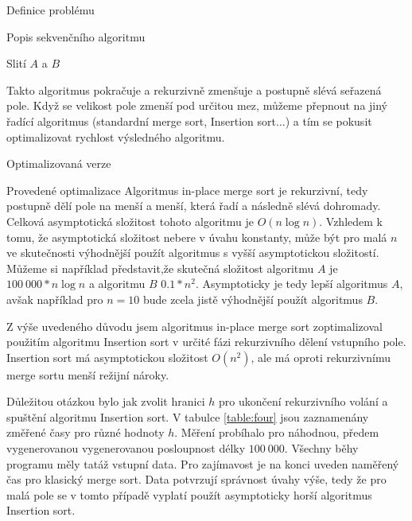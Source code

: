 \documentclass[a4paper,11pt]{article}
\begin{document}
\begin{section}{Definice problému}
\begin{subsection}{Popis sekvenčního algoritmu}
\begin{table}[ht]
\caption{Slití $A$ a $B$}
\label{table:three}
\end{table}

Takto algoritmus pokračuje a rekurzivně zmenšuje a postupně slévá seřazená pole. Když se velikost pole zmenší pod určitou
mez, můžeme přepnout na jiný řadící algoritmus (standardní merge sort, Insertion sort...) a tím se pokusit optimalizovat
rychlost výsledného algoritmu.

\end{subsection}
\end{section}


\begin{section}{Optimalizovaná verze}
\begin{subsection}{Provedené optimalizace}
Algoritmus in-place merge sort je rekurzivní, tedy postupně dělí pole na menší a menší, která řadí a následně slévá dohromady.
Celková asymptotická složitost tohoto algoritmu je $O(n\log{n})$. Vzhledem k tomu, že asymptotická složitost nebere v úvahu
konstanty, může být pro malá $n$ ve skutečnosti výhodnější použít algoritmus s vyšší asymptotickou složitostí. Můžeme si 
například představit,že skutečná složitost algoritmu $A$ je $100~000*n\log{n}$ a algoritmu $B$ $0.1*n^2$. 
Asymptoticky je tedy lepší algoritmus $A$, avšak například pro \(n = 10\) bude zcela jistě výhodnější použít algoritmus $B$.

Z výše uvedeného důvodu jsem algoritmus in-place merge sort zoptimalizoval použitím algoritmu Insertion sort v určité
fázi rekurzivního dělení vstupního pole. Insertion sort má asymptotickou složitost $O(n^2)$, ale má oproti rekurzivnímu
merge sortu menší režijní nároky.

Důležitou otázkou bylo jak zvolit hranici $h$ pro ukončení rekurzivního volání a spuštění algoritmu Insertion sort.
V tabulce \ref{table:four} jsou zaznamenány změřené časy pro různé hodnoty $h$. Měření probíhalo pro náhodnou, předem vygenerovanou
vygenerovanou posloupnost délky $100~000$. Všechny běhy programu měly tatáž vstupní data. Pro zajímavost je na konci
uveden naměřený čas pro klasický merge sort. Data potvrzují správnost úvahy výše, tedy že pro malá pole se v tomto 
případě vyplatí použít asymptoticky horší algoritmus Insertion sort.



\end{subsection}
\end{section}
\end{document}
